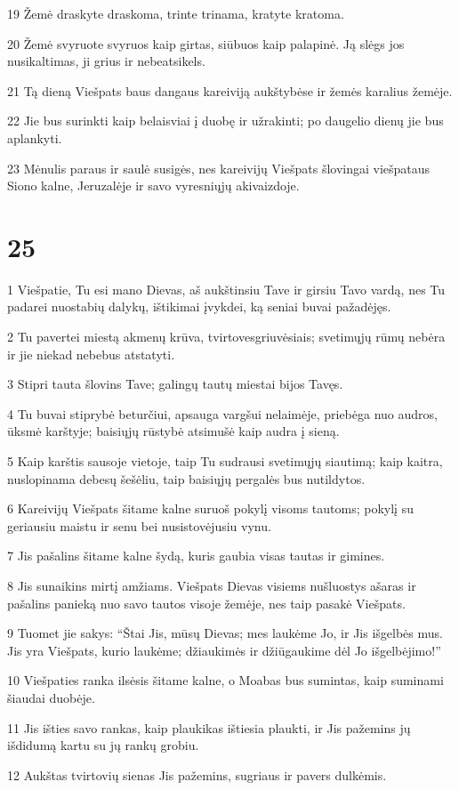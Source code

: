 \par 19 Žemė draskyte draskoma, trinte trinama, kratyte kratoma. 
\par 20 Žemė svyruote svyruos kaip girtas, siūbuos kaip palapinė. Ją slėgs jos nusikaltimas, ji grius ir nebeatsikels. 
\par 21 Tą dieną Viešpats baus dangaus kareiviją aukštybėse ir žemės karalius žemėje. 
\par 22 Jie bus surinkti kaip belaisviai į duobę ir užrakinti; po daugelio dienų jie bus aplankyti. 
\par 23 Mėnulis paraus ir saulė susigės, nes kareivijų Viešpats šlovingai viešpataus Siono kalne, Jeruzalėje ir savo vyresniųjų akivaizdoje.



\chapter{25}


\par 1 Viešpatie, Tu esi mano Dievas, aš aukštinsiu Tave ir girsiu Tavo vardą, nes Tu padarei nuostabių dalykų, ištikimai įvykdei, ką seniai buvai pažadėjęs. 
\par 2 Tu pavertei miestą akmenų krūva, tvirtoves­griuvėsiais; svetimųjų rūmų nebėra ir jie niekad nebebus atstatyti. 
\par 3 Stipri tauta šlovins Tave; galingų tautų miestai bijos Tavęs. 
\par 4 Tu buvai stiprybė beturčiui, apsauga vargšui nelaimėje, priebėga nuo audros, ūksmė karštyje; baisiųjų rūstybė atsimušė kaip audra į sieną. 
\par 5 Kaip karštis sausoje vietoje, taip Tu sudrausi svetimųjų siautimą; kaip kaitra, nuslopinama debesų šešėliu, taip baisiųjų pergalės bus nutildytos. 
\par 6 Kareivijų Viešpats šitame kalne suruoš pokylį visoms tautoms; pokylį su geriausiu maistu ir senu bei nusistovėjusiu vynu. 
\par 7 Jis pašalins šitame kalne šydą, kuris gaubia visas tautas ir gimines. 
\par 8 Jis sunaikins mirtį amžiams. Viešpats Dievas visiems nušluostys ašaras ir pašalins panieką nuo savo tautos visoje žemėje, nes taip pasakė Viešpats. 
\par 9 Tuomet jie sakys: “Štai Jis, mūsų Dievas; mes laukėme Jo, ir Jis išgelbės mus. Jis yra Viešpats, kurio laukėme; džiaukimės ir džiūgaukime dėl Jo išgelbėjimo!” 
\par 10 Viešpaties ranka ilsėsis šitame kalne, o Moabas bus sumintas, kaip suminami šiaudai duobėje. 
\par 11 Jis išties savo rankas, kaip plaukikas ištiesia plaukti, ir Jis pažemins jų išdidumą kartu su jų rankų grobiu. 
\par 12 Aukštas tvirtovių sienas Jis pažemins, sugriaus ir pavers dulkėmis.



